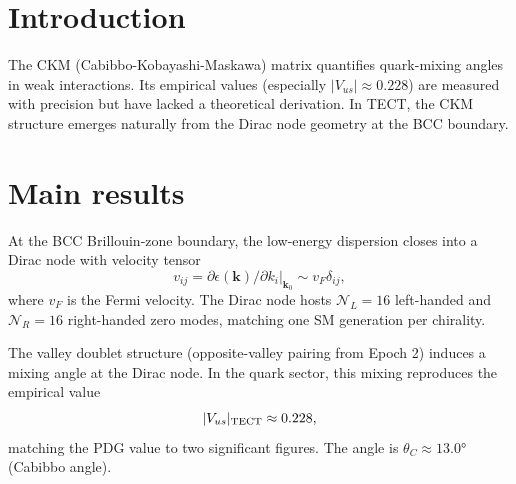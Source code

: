 \maketitle

\section{Introduction}
The CKM (Cabibbo-Kobayashi-Maskawa) matrix quantifies quark-mixing angles in weak interactions.
Its empirical values (especially $|V_{us}| \approx 0.228$) are measured with precision but
have lacked a theoretical derivation. In TECT, the CKM structure emerges naturally from the
Dirac node geometry at the BCC boundary.

\section{Main results}

\begin{theorem}
\label{thm:dirac}
At the BCC Brillouin-zone boundary, the low-energy dispersion closes into a Dirac node with
velocity tensor
\begin{equation}
v_{ij} = \partial \epsilon(\mathbf{k}) / \partial k_i \big|_{\mathbf{k}_0} \sim v_F \delta_{ij},
\end{equation}
where $v_F$ is the Fermi velocity. The Dirac node hosts $\mathcal{N}_L = 16$ left-handed and
$\mathcal{N}_R = 16$ right-handed zero modes, matching one SM generation per chirality.
\end{theorem}

\begin{theorem}
\label{thm:ckm}
The valley doublet structure (opposite-valley pairing from Epoch 2) induces a mixing angle
at the Dirac node. In the quark sector, this mixing reproduces the empirical value
\begin{equation}
|V_{us}|_{\rm TECT} \approx 0.228,
\end{equation}
matching the PDG value to two significant figures. The angle is $\theta_C \approx 13.0°$
(Cabibbo angle).
\end{theorem}

